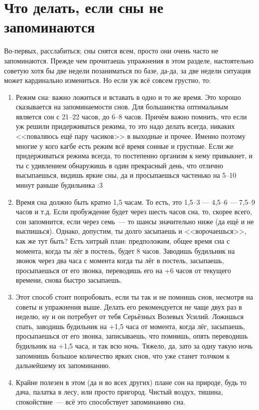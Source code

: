 \documentclass[a4paper,14pt,oneside]{memoir}
\begin{document}
\chapter{Что делать, если сны не запоминаются}
Во-первых, расслабиться; сны снятся всем, просто они очень часто не запоминаются. Прежде чем прочитаешь упражнения в этом разделе, настоятельно советую хотя бы две недели позаниматься по базе, да-да, за две недели ситуация может кардинально измениться. Но если уж всё совсем грустно, то:
\begin{enumerate}
\item Режим сна: важно ложиться и вставать в одно и то же время. Это хорошо сказывается на запоминаемости снов. Для большинства оптимальным является сон с 21--22 часов, до 6--8 часов.
Причём важно помнить, что если уж решили придерживаться режима, то это надо делать всегда, никаких <<поваляюсь ещё пару часиков>> в выходные и прочее. Именно поэтому многие у кого кагбе есть режим всё время сонные и грустные. Если же придерживаться режима всегда, то постепенно организм к нему привыкнет, и ты с удивлением обнаружишь в один прекрасный день, что отлично высыпаешься, видишь яркие сны, да и просыпаешься частенько на 5--10 минут раньше будильника :3
\item Время сна должно быть кратно 1,5 часам. То есть, это 1,5--3 --- 4,5--6 --- 7,5--9 часов и т.д. Если пробуждение будет через шесть часов сна, то, скорее всего, сон запомнится, если через семь~--- то шансы значительно ниже (да ещё и не выспишься). Однако, допустим, ты долго засыпаешь и <<ворочаешься>>, как же тут быть? Есть хитрый план: предположим, общее время сна с момента, когда ты лёг в постель, будет 8 часов. Заводишь будильник на звонок через два часа с момента когда ты лёг в постель, засыпаешь, просыпаешься от его звонка, переводишь его на +6 часов от текущего времени, снова быстро засыпаешь.
\item Этот способ стоит попробовать, если ты так и не помнишь снов, несмотря на советы и упражнения выше. Делать его рекомендуется не чаще двух раз в неделю, ну и он потребует от тебя Серьёзных Волевых Усилий. Ложишься спать, заводишь будильник на +1,5 часа от момента, когда лёг, засыпаешь, просыпаешься от его звонка, записываешь, что помнишь, опять переводишь будильник на +1,5 часа, и так всю ночь. Тяжело, да, зато за одну такую ночь запомнишь большое количество ярких снов, что уже станет толчком к дальнейшему их запоминанию. 
\item Крайне полезен в этом  (да и во всех других) плане сон на природе, будь то дача, палатка в лесу, или просто пригород. Чистый воздух, тишина, спокойствие~--- всё это способствует запоминанию сна.
 

\end{enumerate}
\end{document}
